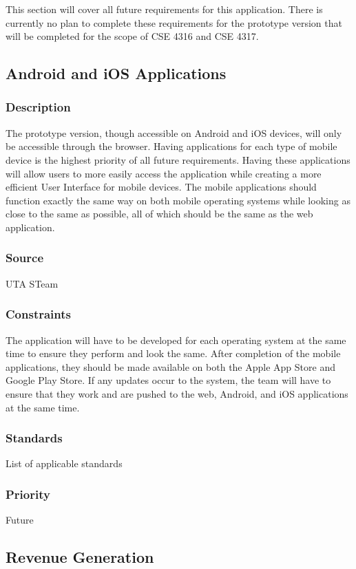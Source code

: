 This section will cover all future requirements for this application. There is currently no plan to complete these requirements for the prototype version that will be completed for the scope of CSE 4316 and CSE 4317.

\subsection{Android and iOS Applications}
\subsubsection{Description}
The prototype version, though accessible on Android and iOS devices, will only be accessible through the browser. Having applications for each type of mobile device is the highest priority of all future requirements. Having these applications will allow users to more easily access the application while creating a more efficient User Interface for mobile devices. The mobile applications should function exactly the same way on both mobile operating systems while looking as close to the same as possible, all of which should be the same as the web application.
\subsubsection{Source}
UTA STeam
\subsubsection{Constraints}
The application will have to be developed for each operating system at the same time to ensure they perform and look the same. After completion of the mobile applications, they should be made available on both the Apple App Store and Google Play Store. If any updates occur to the system, the team will have to ensure that they work and are pushed to the web, Android, and iOS applications at the same time.
\subsubsection{Standards}
List of applicable standards
\subsubsection{Priority}
Future

\subsection{Revenue Generation}
